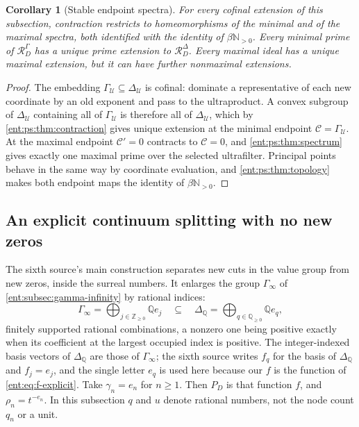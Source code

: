 \documentclass[11pt]{article}
\theoremstyle{plain}
\theoremstyle{plain}
\theoremstyle{plain}
\newtheorem{corollary}[corollary]{Corollary}
\theoremstyle{definition}
\theoremstyle{definition}
\theoremstyle{definition}
\theoremstyle{definition}
\theoremstyle{remark}
\newcommand{\Q}{\mathbb Q}\newcommand{\Z}{\mathbb Z}\newcommand{\N}{\mathbb N}
\newcommand{\RD}{\mathcal R_D}\newcommand{\Ucal}{\mathcal U}
\begin{document}
\begin{corollary}[Stable endpoint spectra]\label{ent:ps:cor:endpoints}
For every cofinal extension of this subsection, contraction restricts to
homeomorphisms of the minimal and of the maximal spectra, both identified
with the identity of $\beta\N_{>0}$. Every minimal prime of $\RD^\Gamma$ has a
unique prime extension to $\RD^\Delta$. Every maximal ideal has a unique
\emph{maximal} extension, but it can have further nonmaximal extensions.
\end{corollary}
\begin{proof}
The embedding $\Gamma_\Ucal\subseteq\Delta_\Ucal$ is cofinal: dominate a
representative of each new coordinate by an old exponent and pass to the
ultraproduct. A convex subgroup of $\Delta_\Ucal$ containing all of
$\Gamma_\Ucal$ is therefore all of $\Delta_\Ucal$, which by
\cref{ent:ps:thm:contraction} gives unique extension at the minimal endpoint
$\mathcal C=\Gamma_\Ucal$. At the maximal endpoint $\mathcal C'=0$ contracts
to $\mathcal C=0$, and \cref{ent:ps:thm:spectrum} gives exactly one maximal
prime over the selected ultrafilter. Principal points behave in the same way
by coordinate evaluation, and \cref{ent:ps:thm:topology} makes both endpoint
maps the identity of $\beta\N_{>0}$.
\end{proof}

\subsection{An explicit continuum splitting with no new zeros}
\label{ent:ps:subsec:splitting}

The sixth source's main construction separates new cuts in the value group
from new zeros, inside the surreal numbers. It enlarges the group
$\Gamma_\infty$ of \cref{ent:subsec:gamma-infinity} by rational indices:
\begin{equation}\label{ent:ps:eq:groups}
 \Gamma_\infty=\bigoplus_{j\in\Z_{\ge0}}\Q e_j
 \quad\subseteq\quad
 \Delta_\Q=\bigoplus_{q\in\Q_{\ge0}}\Q e_q ,
\end{equation}
finitely supported rational combinations, a nonzero one being positive
exactly when its coefficient at the largest occupied index is positive. The
integer-indexed basis vectors of $\Delta_\Q$ are those of $\Gamma_\infty$; the
sixth source writes $f_q$ for the basis of $\Delta_\Q$ and $f_j=e_j$, and the
single letter $e_q$ is used here because our $f$ is the function of
\eqref{ent:eq:f-explicit}. Take $\gamma_n=e_n$ for $n\ge1$. Then $P_D$ is that
function $f$, and $\rho_n=t^{-e_n}$. In this subsection $q$ and $u$ denote
rational numbers, not the node count $q_n$ or a unit.
\end{document}
